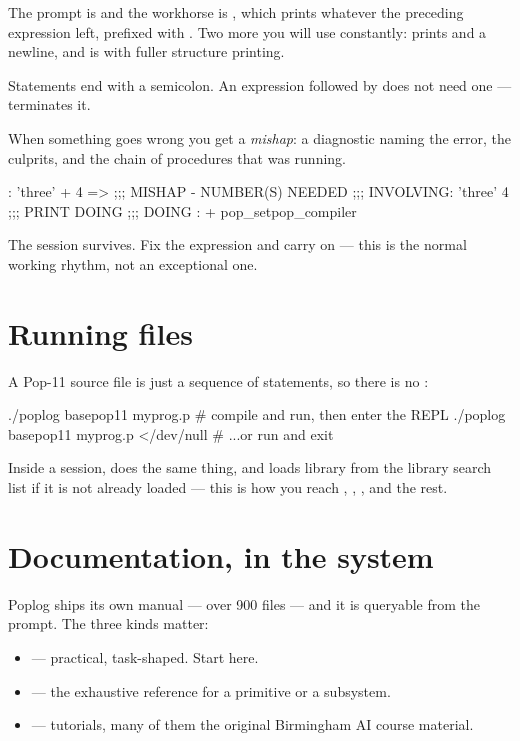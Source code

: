 The prompt is \code{:} and the workhorse is \code{=>}, which prints whatever
the preceding expression left, prefixed with \code{**}. Two more you will use
constantly:  prints  and a newline, and \code{==>} is
\code{=>} with fuller structure printing.

Statements end with a semicolon. An expression followed by \code{=>} does not
need one --- \code{=>} terminates it.

When something goes wrong you get a \emph{mishap}: a diagnostic naming the
error, the culprits, and the chain of procedures that was running.

\begin{repl}
: 'three' + 4 =>
;;; MISHAP - NUMBER(S) NEEDED
;;; INVOLVING:  'three' 4
;;; PRINT DOING
;;; DOING    :  + pop_setpop_compiler
\end{repl}

The session survives. Fix the expression and carry on --- this is the normal
working rhythm, not an exceptional one.

\section{Running files}

A Pop-11 source file is just a sequence of statements, so there is no
:

\begin{sh}
./poplog basepop11 myprog.p        # compile and run, then enter the REPL
./poplog basepop11 myprog.p </dev/null   # ...or run and exit
\end{sh}

Inside a session,  does the same thing, and
 loads library  from the library search list if it
is not already loaded --- this is how you reach , , , and the rest.

\section{Documentation, in the system}

Poplog ships its own manual --- over 900 files --- and it is queryable from
the prompt. The three kinds matter:

\begin{itemize}
\item {} --- practical, task-shaped. Start here.
\item {} --- the exhaustive reference for a primitive or
  a subsystem.
\item {} --- tutorials, many of them the original
  Birmingham AI course material.
\end{itemize}

